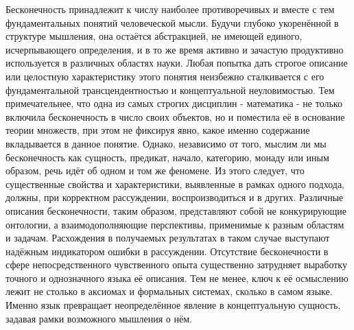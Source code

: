 \documentclass[12pt]{article}
\begin{document}

Бесконечность принадлежит к числу наиболее противоречивых и вместе с тем фундаментальных понятий человеческой мысли. Будучи глубоко укоренённой в структуре мышления, она остаётся абстракцией, не имеющей единого, исчерпывающего определения, и в то же время активно и зачастую продуктивно используется в различных областях науки. Любая попытка дать строгое описание или целостную характеристику этого понятия неизбежно сталкивается с его фундаментальной трансцендентностью и концептуальной неуловимостью. Тем примечательнее, что одна из самых строгих дисциплин - математика - не только включила бесконечность в число своих объектов, но и поместила её в основание теории множеств, при этом не фиксируя явно, какое именно содержание вкладывается в данное понятие. Однако, независимо от того, мыслим ли мы бесконечность как сущность, предикат, начало, категорию, монаду или иным образом, речь идёт об одном и том же феномене. Из этого следует, что существенные свойства и характеристики, выявленные в рамках одного подхода, должны, при корректном рассуждении, воспроизводиться и в других. Различные описания бесконечности, таким образом, представляют собой не конкурирующие онтологии, а взаимодополняющие перспективы, применимые к разным областям и задачам. Расхождения в получаемых результатах в таком случае выступают надёжным индикатором ошибки в рассуждении. Отсутствие бесконечности в сфере непосредственного чувственного опыта существенно затрудняет выработку точного и однозначного языка её описания. Тем не менее, ключ к её осмыслению лежит не столько в аксиомах и формальных системах, сколько в самом языке. Именно язык превращает неопределённое явление в концептуальную сущность, задавая рамки возможного мышления о нём.
\end{document}
